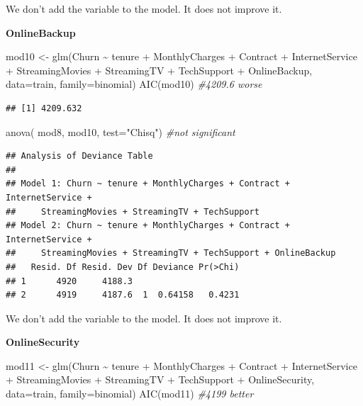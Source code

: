 \documentclass[
  twoside]{article}
\newenvironment{Shaded}{\begin{snugshade}}{\end{snugshade}}
\newcommand{\AttributeTok}[1]{\textcolor[rgb]{0.77,0.63,0.00}{#1}}
\newcommand{\CommentTok}[1]{\textcolor[rgb]{0.56,0.35,0.01}{\textit{#1}}}
\newcommand{\FunctionTok}[1]{\textcolor[rgb]{0.00,0.00,0.00}{#1}}
\newcommand{\NormalTok}[1]{#1}
\newcommand{\OtherTok}[1]{\textcolor[rgb]{0.56,0.35,0.01}{#1}}
\newcommand{\SpecialCharTok}[1]{\textcolor[rgb]{0.00,0.00,0.00}{#1}}
\newcommand{\StringTok}[1]{\textcolor[rgb]{0.31,0.60,0.02}{#1}}
\begin{document}
We don't add the variable to the model. It does not improve it.

\textbf{OnlineBackup}

\begin{Shaded}
\begin{Highlighting}[]
\NormalTok{mod10 }\OtherTok{\textless{}{-}} \FunctionTok{glm}\NormalTok{(Churn }\SpecialCharTok{\textasciitilde{}}\NormalTok{ tenure }\SpecialCharTok{+}\NormalTok{ MonthlyCharges }\SpecialCharTok{+}\NormalTok{ Contract }\SpecialCharTok{+}\NormalTok{ InternetService }\SpecialCharTok{+} 
\NormalTok{               StreamingMovies }\SpecialCharTok{+}\NormalTok{ StreamingTV }\SpecialCharTok{+}\NormalTok{ TechSupport }\SpecialCharTok{+}\NormalTok{ OnlineBackup, }
             \AttributeTok{data=}\NormalTok{train, }\AttributeTok{family=}\NormalTok{binomial)}
\FunctionTok{AIC}\NormalTok{(mod10) }\CommentTok{\#4209.6 worse}
\end{Highlighting}
\end{Shaded}

\begin{verbatim}
## [1] 4209.632
\end{verbatim}

\begin{Shaded}
\begin{Highlighting}[]
\FunctionTok{anova}\NormalTok{( mod8, mod10,  }\AttributeTok{test=}\StringTok{"Chisq"}\NormalTok{) }\CommentTok{\#not significant}
\end{Highlighting}
\end{Shaded}

\begin{verbatim}
## Analysis of Deviance Table
## 
## Model 1: Churn ~ tenure + MonthlyCharges + Contract + InternetService + 
##     StreamingMovies + StreamingTV + TechSupport
## Model 2: Churn ~ tenure + MonthlyCharges + Contract + InternetService + 
##     StreamingMovies + StreamingTV + TechSupport + OnlineBackup
##   Resid. Df Resid. Dev Df Deviance Pr(>Chi)
## 1      4920     4188.3                     
## 2      4919     4187.6  1  0.64158   0.4231
\end{verbatim}

We don't add the variable to the model. It does not improve it.

\textbf{OnlineSecurity}

\begin{Shaded}
\begin{Highlighting}[]
\NormalTok{mod11 }\OtherTok{\textless{}{-}} \FunctionTok{glm}\NormalTok{(Churn }\SpecialCharTok{\textasciitilde{}}\NormalTok{ tenure }\SpecialCharTok{+}\NormalTok{ MonthlyCharges }\SpecialCharTok{+}\NormalTok{ Contract }\SpecialCharTok{+}\NormalTok{ InternetService }\SpecialCharTok{+} 
\NormalTok{               StreamingMovies }\SpecialCharTok{+}\NormalTok{ StreamingTV }\SpecialCharTok{+}\NormalTok{ TechSupport }\SpecialCharTok{+}\NormalTok{ OnlineSecurity, }
             \AttributeTok{data=}\NormalTok{train, }\AttributeTok{family=}\NormalTok{binomial)}
\FunctionTok{AIC}\NormalTok{(mod11) }\CommentTok{\#4199 better}
\end{Highlighting}
\end{Shaded}
\end{document}
